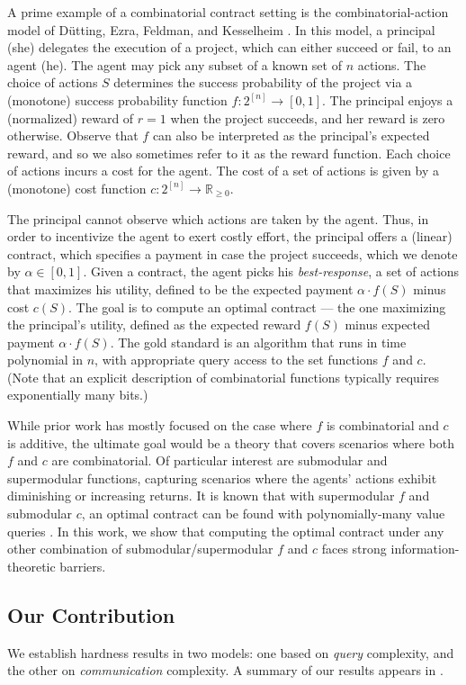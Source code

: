 \documentclass[11pt]{article}
\newcommand{\reals}{\mathbb{R}}
\begin{document}
A prime example of a combinatorial contract setting is the combinatorial-action model of D\"utting, Ezra, Feldman, and Kesselheim \cite{dutting2022combinatorial}.
In this model, a principal (she) delegates the execution of a project, which can either succeed or fail, to an agent (he). 
The agent may pick any subset of a known set of $n$ actions. 
The choice of actions $S$ determines the success probability of the project via a (monotone) success probability function $f:2^{[n]}\rightarrow [0,1]$. The principal enjoys a (normalized) reward of $r = 1$ when the project succeeds, and her reward is zero otherwise. 
Observe that $f$ can also be interpreted as the principal's expected reward, and so we also sometimes refer to it as the reward function. 
Each choice of actions incurs a cost for the agent. The cost of a set of actions is given by a (monotone) cost function $c: 2^{[n]} \rightarrow \reals_{\geq 0}$.

The principal cannot observe which actions are taken by the agent. Thus, in order to incentivize the agent to exert costly effort, the principal offers a (linear) contract, which specifies a payment in case the project succeeds, which we denote by $\alpha \in [0,1]$.
Given a contract, the agent picks his \textit{best-response}, a set of actions that maximizes his utility, defined to be the expected payment $\alpha \cdot f(S)$ minus cost $c(S)$. 
The goal is to compute an optimal contract --- the one maximizing the principal's utility, defined as the expected reward $f(S)$ minus expected payment $\alpha \cdot f(S)$.
The gold standard is an algorithm that runs in time polynomial in $n$, with appropriate query access to the set functions $f$ and $c$. (Note that an explicit description of combinatorial
functions typically requires exponentially many bits.)


While prior work has mostly focused on the case where $f$ is combinatorial and $c$ is additive, the ultimate goal would be a theory that covers scenarios where both $f$ and $c$ are combinatorial.
Of particular interest are submodular and supermodular functions, capturing scenarios where the agents' actions exhibit diminishing or increasing returns. 
It is known that with supermodular $f$ and submodular $c$, an optimal contract can be found with polynomially-many value queries \cite{dutting2024combinatorial}. 
In this work, we show that computing the optimal contract under any other combination of submodular/supermodular $f$ and $c$ faces strong information-theoretic barriers. 


\subsection{Our Contribution}
We establish hardness results in two models: one based on \textit{query} complexity, and the other on \textit{communication} complexity. A summary of our results appears in .
\end{document}
